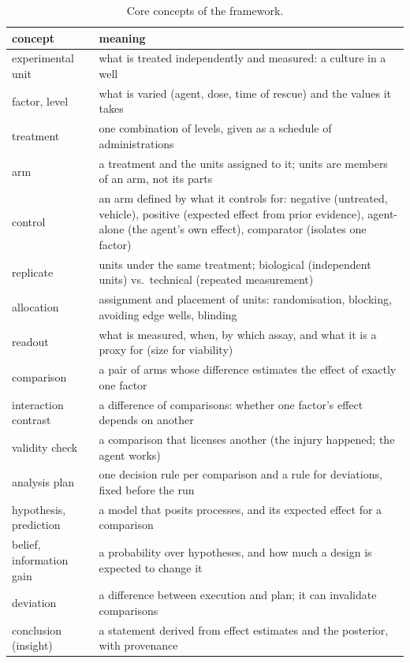 \documentclass[10pt,a4paper]{article}
\begin{document}
\begin{table}[tbp]\centering\small
\caption{Core concepts of the framework.}\label{tab:concepts}
\begin{tabularx}{\linewidth}{@{}p{3.2cm}X@{}}\toprule concept & meaning \\ \midrule
experimental unit & what is treated independently and measured: a culture in a well \\
factor, level & what is varied (agent, dose, time of rescue) and the values it takes \\
treatment & one combination of levels, given as a schedule of administrations \\
arm & a treatment and the units assigned to it; units are members of an arm, not its parts \\
control & an arm defined by what it controls for: negative (untreated, vehicle), positive (expected effect from prior evidence), agent-alone (the agent's own effect), comparator (isolates one factor) \\
replicate & units under the same treatment; biological (independent units) vs.\ technical (repeated measurement) \\
allocation & assignment and placement of units: randomisation, blocking, avoiding edge wells, blinding \\
readout & what is measured, when, by which assay, and what it is a proxy for (size for viability) \\
comparison & a pair of arms whose difference estimates the effect of exactly one factor \\
interaction contrast & a difference of comparisons: whether one factor's effect depends on another \\
validity check & a comparison that licenses another (the injury happened; the agent works) \\
analysis plan & one decision rule per comparison and a rule for deviations, fixed before the run \\
hypothesis, prediction & a model that posits processes, and its expected effect for a comparison \\
belief, information gain & a probability over hypotheses, and how much a design is expected to change it \\
deviation & a difference between execution and plan; it can invalidate comparisons \\
conclusion (insight) & a statement derived from effect estimates and the posterior, with provenance \\
\bottomrule\end{tabularx}\end{table}
\end{document}
